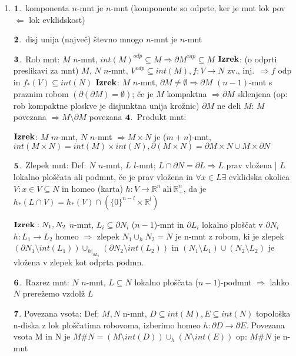 \documentclass[10pt,a4paper]{article}
\begin{document}
\begin{enumerate}
    
\item $\bold{1}$.~komponenta $n$-mnt je $n$-mnt (komponente so odprte, ker je mnt lok pov $\Leftarrow$ lok evklidskost) 
    
    $\bold{2}$.~disj unija (največ) števno mnogo $n$-mnt je $n$-mnt 
    
    $\bold{3}$.~Rob mnt: $M$ $n$-mnt,
    $int(M)^{odp} \subseteq M \Rightarrow \partial M^{zap} \subseteq M$
    \newline $\bold{Izrek}$: (o odprti preslikavi za mnt) $M$, $N$ $n$-mnt, $V^{odp} \subseteq int(M), f: V \rightarrow N$ zv., inj.~$\Rightarrow f$ odp in $f_\ast (V) \subseteq int(N)$
    \newline $\bold{Izrek}$: $M$ $n$-mnt, $\partial M \neq \emptyset \Rightarrow \partial M$ $(n-1)$-mnt s praznim robom $(\partial (\partial M) = \emptyset)$; če je $M$ kompaktna $\Rightarrow \partial M$ sklenjena
    (op: rob kompaktne ploskve je disjunktna unija krožnic) \quad $\partial M$ ne deli $M$: $M$ povezana $\Rightarrow M \setminus \partial M$ povezana
    \newline 
    $\bold{4}$.~Produkt mnt: 
    
    $\bold{Izrek}$: $M$ $m$-mnt, $N$ $n$-mnt $\Rightarrow M \times N$ je ($m+n$)-mnt, $int(M \times N) = int(M) \times int(N), \partial (M \times N) = \partial M \times N \cup M \times \partial N$
    
    $\bold{5}$.~Zlepek mnt: Def: $N$ $n$-mnt, $L$ $l$-mnt; $L \cap \partial N = \partial L \Rightarrow L$ prav vložena | $L$ lokalno ploščata ali podmnt, če je prav vložena in $\forall x \in L \exists$ evklidska okolica
    $V: x \in V \subseteq N$ in homeo (karta) $h: V \rightarrow \mathbb{R}^n~\text{ali}~\mathbb{R}^{n}_+$, da je $h_\ast(L\cap V) = h_\ast(V) \cap (\{0\}^{n-l}\times \mathbb{R}^l)$
    
    $\bold{Izrek}: N_1, N_2$ $n$-mnt, $L_i \subseteq \partial N_i$ ($n-1$)-mnt in $\partial L_i$ lokalno ploščat v $\partial N_i$ \quad $h: L_1 \rightarrow L_2$ homeo $\Rightarrow$ zlepek $N_1 \cup_h N_2 = N$
    je n-mnt z robom, ki je zlepek $(\partial N_1 \setminus int(L_1)) \cup_{h|_{\partial L_1}} (\partial N_2 \setminus int(L_2))$ in $(N_1 \setminus L_1) \cup (N_2 \setminus L_2)$ je vložena v zlepek kot odprta podmn.
    
    $\bold{6}$.~Razrez mnt: $N$ $n$-mnt, $L \subseteq N$ lokalno ploščata ($n-1$)-podmnt $\Rightarrow$ lahko $N$ prerežemo vzdolž $L$ 
    
    $\bold{7}$. Povezana vsota: Def: $M,N$ n-mnt, $D \subseteq int(M), E \subseteq int(N)$
    topološka n-diska z lok ploščatima robovoma, izberimo homeo $h: \partial D \rightarrow \partial E$. Povezana vsota M in N je $M \# N = (M \setminus int(D)) \cup_h (N \setminus int(E))$ op: $M \# N$ je n-mnt
    

\end{enumerate}
\end{document}
